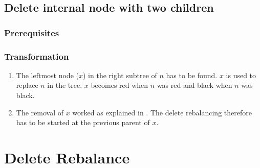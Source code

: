\documentclass[a4paper,10pt,twoside]{article}
\begin{document}
\subsection{Delete internal node with two children}

\subsubsection{Prerequisites}

\begin{center}
\end{center}

\subsubsection{Transformation}

\begin{enumerate}
\item The leftmost node ($x$) in the right subtree of $n$ has to be found. $x$
is used to replace $n$ in the tree. $x$ becomes red when $n$ was red and black
when $n$ was black.

\begin{center}
\end{center}


\item The removal of $x$ worked as explained in . The
delete rebalancing therefore has to be started at the previous parent of $x$.

\end{enumerate}


\newpage
\section{Delete Rebalance}
\end{document}
